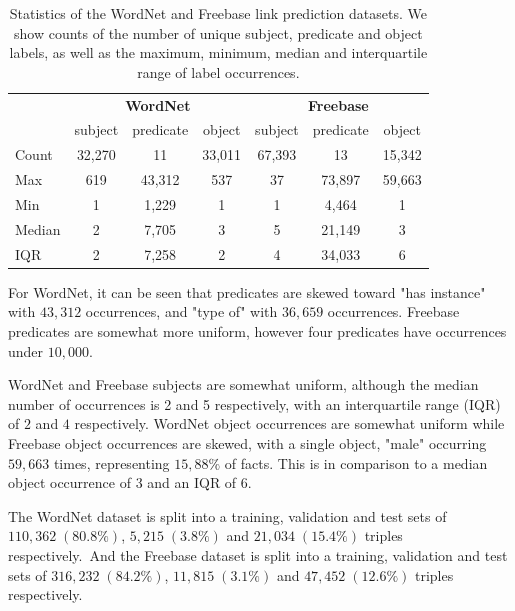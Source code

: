 \begin{table}[H]
	\begin{center}
	\begin{tabular}{|l|ccc|ccc|}
		\hline
 		& \multicolumn{3}{c|}{\textbf{WordNet}} & \multicolumn{3}{c|}{\textbf{Freebase}} \\
		& subject & predicate & object & subject & predicate & object \\
		\hline 
		Count & 32,270 & 11 & 33,011 & 67,393 & 13 & 15,342 \\
		Max & 619 & 43,312 & 537 & 37 & 73,897 & 59,663 \\
		Min & 1 & 1,229 & 1 & 1 & 4,464 & 1 \\
		Median & 2 & 7,705 & 3 & 5 & 21,149 & 3 \\
		IQR & 2 & 7,258 & 2 & 4 & 34,033 & 6 \\
		\hline 
	\end{tabular}
	\end{center}
	\captionsetup{justification=centering}
	\caption{Statistics of the WordNet and Freebase link prediction datasets. We show counts of the number of unique subject, predicate and object labels, as well as the maximum, minimum, median and interquartile range of label occurrences.}
\end{table}

\noindent For WordNet, it can be seen that predicates are skewed toward "has instance" with $ 43, 312 $ occurrences, and "type of" with $ 36, 659 $ occurrences. Freebase predicates are somewhat more uniform, however four predicates have occurrences under $ 10, 000 $. \par

\noindent WordNet and Freebase subjects are somewhat uniform, although the median number of occurrences is 2 and 5 respectively, with an interquartile range (IQR) of $ 2 $ and $ 4 $ respectively. WordNet object occurrences are somewhat uniform while Freebase object occurrences are skewed, with a single object, "male" occurring $ 59, 663 $ times, representing $15, 88\% $ of facts. This is in comparison to a median object occurrence of $ 3 $ and an IQR of $ 6 $. \par

\noindent The WordNet dataset is split into a training, validation and test sets of $ 110, 362 \; (80.8 \%) $, $ 5, 215 \; (3.8 \%) $ and $ 21, 034 \; (15.4 \%) $ triples respectively.\ And the Freebase dataset is split into a training, validation and test sets of $ 316, 232 \; (84.2 \%) $, $ 11, 815 \; (3.1 \%) $ and $ 47, 452 \; (12.6 \%) $ triples respectively. 


